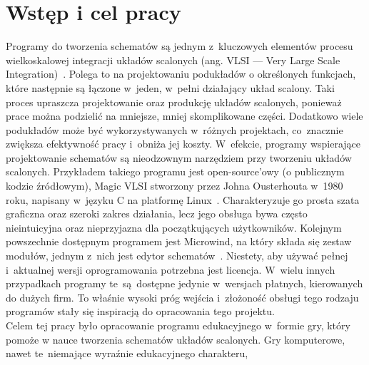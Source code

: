 \chapter{Wstęp i cel pracy}

Programy do tworzenia schematów są jednym z~kluczowych elementów
procesu wielkoskalowej integracji układów scalonych (ang. VLSI — Very Large Scale Integration)~\cite{VLSI_insemi}.
Polega to na projektowaniu podukładów o określonych funkcjach,
które następnie są łączone w~jeden, w~pełni działający układ scalony.
Taki proces upraszcza projektowanie oraz produkcję układów scalonych, ponieważ prace można podzielić na mniejsze,
mniej skomplikowane części.
Dodatkowo wiele podukładów może być wykorzystywanych w~różnych projektach,
co~znacznie zwiększa efektywność pracy i~obniża jej koszty.
W~efekcie,
programy wspierające projektowanie schematów są nieodzownym narzędziem przy tworzeniu układów scalonych.
Przykładem takiego programu jest open-source'owy (o publicznym kodzie źródłowym),
Magic VLSI stworzony przez Johna Ousterhouta w~1980 roku,
napisany w~języku C na platformę Linux~\cite{MAGIC_article}.
Charakteryzuje go prosta szata graficzna oraz szeroki zakres działania,
lecz jego obsługa bywa często nieintuicyjna oraz nieprzyjazna dla początkujących użytkowników.
Kolejnym powszechnie dostępnym programem jest Microwind,
na który składa się zestaw modułów,
jednym z~nich jest edytor schematów~\cite{Microwind}.
Niestety, aby używać pełnej i~aktualnej wersji oprogramowania potrzebna jest licencja.
W~wielu innych przypadkach programy te~są~dostępne jedynie w~wersjach płatnych, kierowanych do dużych firm.
To właśnie wysoki próg wejścia
i~złożoność obsługi tego rodzaju programów stały się inspiracją do opracowania tego projektu.\\
\indent Celem tej pracy było opracowanie programu edukacyjnego w~formie gry,
który pomoże w nauce tworzenia schematów układów scalonych.
Gry komputerowe, nawet te~niemające wyraźnie edukacyjnego charakteru,
